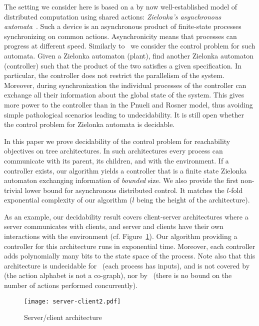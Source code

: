 \documentclass{llncs}
\begin{document}
The setting we consider here is based on a by
now well-established model of distributed computation using
shared actions: \emph{Zielonka's asynchronous
  automata}~\cite{zie87}. Such a device is an asynchronous product of
finite-state processes synchronizing on common actions.  
Asynchronicity means that processes can progress at different speed. 
Similarly to~\cite{GLZ04,MTY05} 
we consider the control problem for such automata. 
Given a Zielonka automaton (plant), find another Zielonka automaton
(controller) such that the product of the two satisfies a given
specification. In particular, the controller does
not restrict the parallelism of the system.
Moreover, during synchronization the individual processes of the controller
can exchange all their 
information about the global state of the system. This gives more
power to the controller than in the Pnueli and Rosner model, thus
avoiding simple pathological scenarios leading to undecidability. 
It is still open whether the control problem for Zielonka automata is
decidable.  

In this paper we prove decidability of the control problem  for
reachability objectives on tree architectures. 
In such architectures every process can communicate with its parent,
its children, and with the environment. 
If a controller exists, our algorithm yields a controller that is a
finite state Zielonka automaton exchanging information of
\emph{bounded} size.  We also provide the first non-trivial lower bound for
asynchronous distributed control. It matches the $l$-fold exponential
complexity of our algorithm ($l$ being the height of the
architecture). 


As an example, our decidability result covers client-server
architectures where a server communicates with clients, and server and
clients have their own interactions with the environment
(cf. Figure~\ref{fig:server-client}). Our algorithm providing a
controller for this architecture runs in exponential time. Moreover,
each controller adds polynomially many bits to the state space of the
process.  Note also that this architecture is undecidable
for~\cite{PR90} (each process has inputs), and is not covered
by~\cite{GLZ04} (the action alphabet is not a co-graph), nor
by~\cite{MTY05} (there is no bound on the number of actions performed
concurrently).
\begin{figure}[b]
\centering
  \vspace{-0.7cm}
  \texttt{[image: server-client2.pdf]}
\caption{Server/client architecture}
  \label{fig:server-client}
\end{figure}
\medskip
\end{document}
